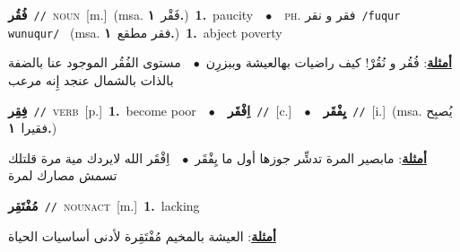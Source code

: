 \documentclass[10pt,a4paper,twoside]{article} %
\begin{document}
\begin{multicols}{2}
{\setlength\topsep{0pt}\textbf{\foreignlanguage{arabic}{فُقُر}}\ {\color{gray}\texttt{//}\color{black}}\ \textsc{noun}\ [m.]\ \color{gray}(msa. \foreignlanguage{arabic}{فَقْر}~\foreignlanguage{arabic}{\textbf{١.}})\color{black}\ \textbf{1.}~paucity\ \ $\bullet$\ \ \textsc{ph.} \color{gray} \foreignlanguage{arabic}{فقر و نقر}\color{black}\ {\color{gray}\texttt{/{\sffamily fuqur wunuqur}/}\color{black}}\ \color{gray} (msa. \foreignlanguage{arabic}{فقر مطقع}~\foreignlanguage{arabic}{\textbf{١.}})\color{black}\ \textbf{1.}~abject poverty\  \begin{flushright}\color{gray}\foreignlanguage{arabic}{\textbf{\underline{\foreignlanguage{arabic}{أمثلة}}}: فُقُر و نُقُرْ! كيف راضيات بهالعيشة وببزرِن\ $\bullet$\ \  مستوى الفُقُر الموجود عنا بالضفة بالذات بالشمال عنجد إِنه مرعب}\end{flushright}\color{black}} \vspace{2mm}

{\setlength\topsep{0pt}\textbf{\foreignlanguage{arabic}{فِقِر}}\ {\color{gray}\texttt{//}\color{black}}\ \textsc{verb}\ [p.]\ \textbf{1.}~become poor\ \ $\bullet$\ \ \setlength\topsep{0pt}\textbf{\foreignlanguage{arabic}{اِفْقَر}}\ {\color{gray}\texttt{//}\color{black}}\ [c.]\ \ $\bullet$\ \ \setlength\topsep{0pt}\textbf{\foreignlanguage{arabic}{يِفْقَر}}\ {\color{gray}\texttt{//}\color{black}}\ [i.]\ \color{gray}(msa. \foreignlanguage{arabic}{يُصبِح فقيرا}~\foreignlanguage{arabic}{\textbf{١.}})\color{black}\  \begin{flushright}\color{gray}\foreignlanguage{arabic}{\textbf{\underline{\foreignlanguage{arabic}{أمثلة}}}: مابصير المرة تدشِّر جوزها أول ما يِفْقَر\ $\bullet$\ \  اِفْقَر الله لايردك مية مرة قلتلك تسمش مصارك لمرة}\end{flushright}\color{black}} \vspace{2mm}

{\setlength\topsep{0pt}\textbf{\foreignlanguage{arabic}{مُفْتَقِر}}\ {\color{gray}\texttt{//}\color{black}}\ \textsc{noun\textunderscore act}\ [m.]\ \textbf{1.}~lacking\  \begin{flushright}\color{gray}\foreignlanguage{arabic}{\textbf{\underline{\foreignlanguage{arabic}{أمثلة}}}: العيشة بالمخيم مُفْتَقِرة لأدنى أساسيات الحياة}\end{flushright}\color{black}} \vspace{2mm}


\end{multicols}
\end{document}
